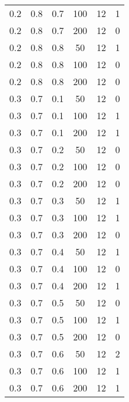 \begin{table}[h]
\begin{center}
\begin{tabular}{|c|c|c|c|c|c|}
	0.2 &  0.8 &  0.7 &  100 &    12 &     1 \\
	0.2 &  0.8 &  0.7 &  200 &    12 &     0 \\
   \hline
	0.2 &  0.8 &  0.8 &   50 &    12 &     1 \\
	0.2 &  0.8 &  0.8 &  100 &    12 &     0 \\
	0.2 &  0.8 &  0.8 &  200 &    12 &     0 \\
   \hline
	0.3 &  0.7 &  0.1 &   50 &    12 &     0 \\
	0.3 &  0.7 &  0.1 &  100 &    12 &     1 \\
	0.3 &  0.7 &  0.1 &  200 &    12 &     1 \\
   \hline
	0.3 &  0.7 &  0.2 &   50 &    12 &     0 \\
	0.3 &  0.7 &  0.2 &  100 &    12 &     0 \\
	0.3 &  0.7 &  0.2 &  200 &    12 &     0 \\
   \hline
	0.3 &  0.7 &  0.3 &   50 &    12 &     1 \\
	0.3 &  0.7 &  0.3 &  100 &    12 &     1 \\
	0.3 &  0.7 &  0.3 &  200 &    12 &     0 \\
   \hline
	0.3 &  0.7 &  0.4 &   50 &    12 &     1 \\
	0.3 &  0.7 &  0.4 &  100 &    12 &     0 \\
	0.3 &  0.7 &  0.4 &  200 &    12 &     1 \\
   \hline
	0.3 &  0.7 &  0.5 &   50 &    12 &     0 \\
	0.3 &  0.7 &  0.5 &  100 &    12 &     1 \\
	0.3 &  0.7 &  0.5 &  200 &    12 &     0 \\
   \hline
	0.3 &  0.7 &  0.6 &   50 &    12 &     2 \\
	0.3 &  0.7 &  0.6 &  100 &    12 &     1 \\
	0.3 &  0.7 &  0.6 &  200 &    12 &     1 \\
   \hline
    		\end{tabular}
	\end{center}
\end{table}
